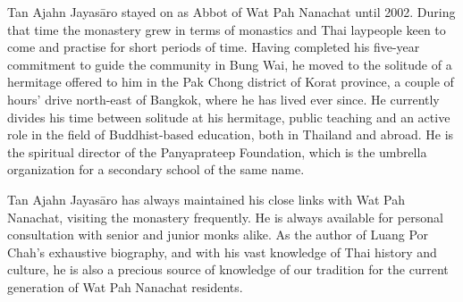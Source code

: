 Tan Ajahn Jayasāro stayed on as Abbot of Wat Pah Nanachat until
2002. During that time the monastery grew in terms of monastics and Thai
laypeople keen to come and practise for short periods of time. Having
completed his five-year commitment to guide the community in Bung Wai,
he moved to the solitude of a hermitage offered to him in the Pak Chong
district of Korat province, a couple of hours' drive north-east of
Bangkok, where he has lived ever since. He currently divides his time
between solitude at his hermitage, public teaching and an active role in
the field of Buddhist-based education, both in Thailand and abroad. He
is the spiritual director of the Panyaprateep Foundation, which is the
umbrella organization for a secondary school of the same name.

Tan Ajahn Jayasāro has always maintained his close links with Wat
Pah Nanachat, visiting the monastery frequently. He is always available
for personal consultation with senior and junior monks alike. As the
author of Luang Por Chah's exhaustive biography, and with his vast
knowledge of Thai history and culture, he is also a precious source of
knowledge of our tradition for the current generation of Wat Pah
Nanachat residents.

